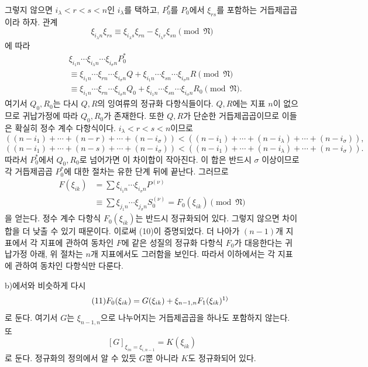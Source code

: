 그렇지 않으면 \(i_\lambda<r<s<n\)인 \(i_\lambda\)를 택하고, \(P_0^*\)를 \(P_0\)에서 \(\xi_{rs}\)를 포함하는 거듭제곱곱이라 하자. 관계
\[
\xi_{i_\lambda n}\xi_{rs}\equiv
\xi_{i_\lambda s}\xi_{rn}-\xi_{i_\lambda r}\xi_{sn}
\pmod{\mathfrak N}
\]
에 따라
\begin{align*}
&\xi_{i_1n}\cdots\xi_{i_\lambda n}\cdots\xi_{i_\sigma n}P_0^*\\
&\equiv
\xi_{i_1n}\cdots\xi_{rn}\cdots\xi_{i_\sigma n}Q
+
\xi_{i_1n}\cdots\xi_{sn}\cdots\xi_{i_\sigma n}R
\pmod{\mathfrak N}\\
&\equiv
\xi_{i_1n}\cdots\xi_{rn}\cdots\xi_{i_\sigma n}Q_0
+
\xi_{i_1n}\cdots\xi_{sn}\cdots\xi_{i_\sigma n}R_0
\pmod{\mathfrak N}.
\end{align*}
여기서 \(Q_0,R_0\)는 다시 \(Q,R\)의 잉여류의 정규화 다항식들이다. \(Q,R\)에는 지표 \(n\)이 없으므로 귀납가정에 따라 \(Q_0,R_0\)가 존재한다. 또한 \(Q,R\)가 단순한 거듭제곱곱이므로 이들은 확실히 정수 계수 다항식이다. \(i_\lambda<r<s<n\)이므로
\[
((n-i_1)+\cdots+(n-r)+\cdots+(n-i_\sigma))
<
((n-i_1)+\cdots+(n-i_\lambda)+\cdots+(n-i_\sigma)),
\]
\[
((n-i_1)+\cdots+(n-s)+\cdots+(n-i_\sigma))
<
((n-i_1)+\cdots+(n-i_\lambda)+\cdots+(n-i_\sigma)).
\]
따라서 \(P_0^*\)에서 \(Q_0,R_0\)로 넘어가면 이 차이합이 작아진다. 이 합은 반드시 \(\sigma\) 이상이므로 각 거듭제곱곱 \(P_0^*\)에 대한 절차는 유한 단계 뒤에 끝난다. 그러므로
\[
\begin{aligned}
F(\xi_{ik})
&=\sum \xi_{i_1n}\cdots\xi_{i_\sigma n}P^{(\nu)}\\
&\equiv
\sum \xi_{j_1n}\cdots\xi_{j_\sigma n}S_0^{(\nu)}
=F_0(\xi_{ik})\pmod{\mathfrak N}
\end{aligned}
\]
을 얻는다. 정수 계수 다항식 \(F_0(\xi_{ik})\)는 반드시 정규화되어 있다. 그렇지 않으면 차이합을 더 낮출 수 있기 때문이다. 이로써 (10)이 증명되었다. 더 나아가 \((n-1)\)개 지표에서 각 지표에 관하여 동차인 \(F\)에 같은 성질의 정규화 다항식 \(F_0\)가 대응한다는 귀납가정 아래, 위 절차는 \(n\)개 지표에서도 그러함을 보인다. 따라서 이하에서는 각 지표에 관하여 동차인 다항식만 다룬다.

b)에서와 비슷하게 다시
\begin{equation}
\tag{11}
F_0(\xi_{ik})=G(\xi_{ik})+\xi_{n-1,n}F_1(\xi_{ik})\srcfnmark{1)}
\end{equation}
로 둔다. 여기서 \(G\)는 \(\xi_{n-1,n}\)으로 나누어지는 거듭제곱곱을 하나도 포함하지 않는다. 또
\begin{equation}
\tag{12}
\left[G\right]_{\xi_{in}=\xi_{i,n-1}}=K(\xi_{ik})
\end{equation}
로 둔다. 정규화의 정의에서 알 수 있듯 \(G\)뿐 아니라 \(K\)도 정규화되어 있다.

